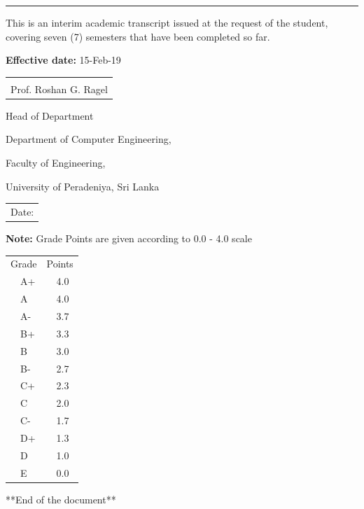 \documentclass[12pt]{article}
\makeatletter
\newcommand{\sign}[1]{%
  \begin{tabular}[t]{@{}l@{}}
  \makebox[2.5in]{\dotfill}\\
  \strut#1\strut
  \end{tabular}%
}
\newcommand{\Date}{%
  \begin{tabular}[t]{@{}p{2.5in}@{}}
  \\[-2ex]
  \strut Date: \dotfill\strut
  \end{tabular}%
}
\makeatother
\begin{document}
\noindent\rule{\textwidth}{1pt}
\vspace{5pt}
This is an interim academic transcript issued at the request of the student, covering seven (7) semesters that have been completed so far.
\vspace{5pt}

\noindent\textbf{Effective date:} 15-Feb-19

\vspace{45pt}

\noindent
\begin{minipage}[t]{0.5\linewidth}
    \raggedright
    \sign{Prof. Roshan G. Ragel}
    \par
    Head of Department\par
    Department of Computer Engineering, \par
    Faculty of Engineering, \par
    University of Peradeniya, Sri Lanka
\end{minipage}%
\hfill
  \begin{minipage}[t]{0.4\linewidth}
    \Date
  \end{minipage}



\textbf{Note:} Grade Points are given according to 0.0 - 4.0 scale

\begin{table}[H]
\centering
\begin{tabular}{ll}
\multicolumn{1}{c}{Grade} &
\multicolumn{1}{c}{Points}\\
\ \ A+    & \ \ 4.0    \\ 
\ \ A     & \ \ 4.0    \\ 
\ \ A-    & \ \ 3.7    \\ 
\ \ B+    & \ \ 3.3    \\ 
\ \ B    & \ \ 3.0    \\ 
\ \ B-    & \ \ 2.7    \\ 
\ \ C+    & \ \ 2.3    \\ 
\ \ C     & \ \ 2.0    \\ 
\ \ C-    & \ \ 1.7    \\ 
\ \ D+    & \ \ 1.3    \\ 
\ \ D     & \ \ 1.0    \\ 
\ \ E     & \ \ 0.0    \\ 
\end{tabular}
\end{table}

\begin{center}
**End of the document**
\end{center}
\end{document}
